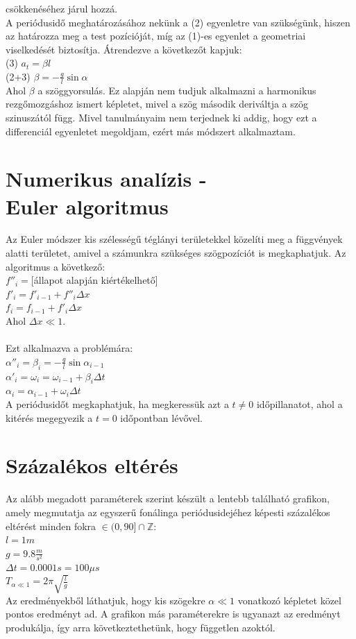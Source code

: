 \documentclass{article}
\begin{document}
\begin{multicols}{2}
	csökkenéséhez járul hozzá. \\
	A periódusidő meghatározásához nekünk a (2) egyenletre van szükségünk,
	hiszen az határozza meg a test pozícióját, míg az (1)-es egyenlet a
	geometriai viselkedését biztosítja. Átrendezve a következőt kapjuk: \\
	(3) $a_{t} = \beta l$ \\
	(2+3) $\beta = -\frac{g}{l}\sin\alpha$ \\
	Ahol $\beta$ a szöggyorsulás. Ez alapján nem tudjuk alkalmazni a
	harmonikus rezgőmozgáshoz ismert képletet, mivel a szög második
	deriváltja a szög szinuszától függ. Mivel tanulmányaim nem terjednek
	ki addig, hogy ezt a differenciál egyenletet megoldjam, ezért más
	módszert alkalmaztam.

\section{Numerikus analízis - \\ Euler algoritmus}
	Az Euler módszer kis szélességű téglányi területekkel közelíti
	meg a függvények alatti területet, amivel a számunkra szükséges
	szögpozíciót is megkaphatjuk. Az algoritmus a következő: \\
	$f''_{i} = $[állapot alapján kiértékelhető] \\
	$f'_{i} = f'_{i-1} + f''_{i}\Delta x$ \\
	$f_{i} = f_{i-1} + f'_{i}\Delta x$ \\
	Ahol $\Delta x \ll 1$. \\
	\\
	Ezt alkalmazva a problémára: \\
	$\alpha''_{i} = \beta_{i} = -\frac{g}{l}\sin\alpha_{i-1}$ \\
	$\alpha'_{i} = \omega_{i} = \omega_{i-1} + \beta_{i}\Delta t$ \\
	$\alpha_{i} = \alpha_{i-1} + \omega_{i}\Delta t$ \\
	A periódusidőt megkaphatjuk, ha megkeressük azt a $t \neq 0$
	időpillanatot, ahol a kitérés megegyezik a $t=0 $ időpontban
	lévővel.

\section{Százalékos eltérés}
	Az alább megadott paraméterek szerint készült a lentebb található grafikon,
	amely megmutatja az egyszerű fonálinga periódusidejéhez képesti százalékos
	eltérést minden fokra $\in (0,90] \cap \mathbb{Z} $: \\
	$l = 1m$ \\
	$g = 9.8\frac{m}{s^2}$ \\
	$\Delta t = 0.0001s = 100\mu s$ \\
	$T_{\alpha \ll 1} = 2\pi\sqrt{\frac{l}{g}}$ \\
	Az eredményekből láthatjuk, hogy kis szögekre $\alpha \ll 1$ vonatkozó képletet
	közel pontos eredményt ad. A grafikon más paraméterekre is ugyanazt az eredményt
	produkálja, így arra következtethetünk, hogy független azoktól.


\end{multicols}
\end{document}
